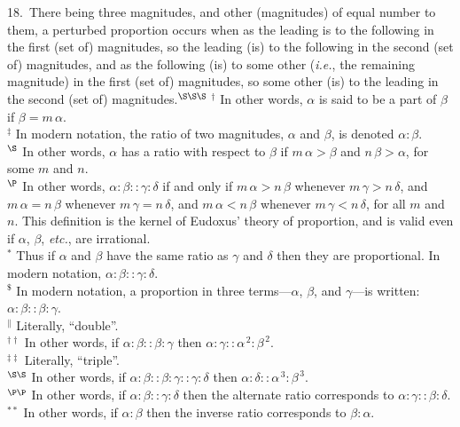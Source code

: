 18.~There being three magnitudes,
  and  other (magnitudes)
 of equal  number to them,  a  perturbed proportion occurs  when  as 
 the  leading is to the following
 in the first (set of) magnitudes, so the  leading (is) to the following  in the second (set of) magnitudes, and as   the following (is) to
 some other ({\em i.e.}, the remaining magnitude) in the first (set of) magnitudes, so some other (is)  to the leading  in the second (set of) magnitudes.$^{\S\S\S}$
{\footnotesize \noindent$^\dag$ In other words, $\alpha$ is said to be a part of $\beta$ if $\beta = m\,\alpha$.\\[0.5ex]
$^\ddag$ In modern notation, the ratio of two 
magnitudes, $\alpha$ and $\beta$, is denoted $\alpha:\beta$.\\[0.5ex]
$^\S$ In other words, $\alpha$ has a ratio with respect to $\beta$ if $m\,\alpha >\beta$
and $n\,\beta>\alpha$, for some $m$ and $n$.\\[0.5ex]
$^\P$ In other words, $\alpha:\beta::\gamma:\delta$ if and only if $m\,\alpha>n\,\beta$ whenever $m\,\gamma>n\,\delta$, and $m\,\alpha=n\,\beta$
whenever $m\,\gamma=n\,\delta$, and $m\,\alpha< n\,\beta$ whenever $m\,\gamma<
n\,\delta$, for all $m$ and $n$. This definition  is the kernel of Eudoxus' theory of proportion, and is valid even if $\alpha$,  $\beta$, {\em etc.}, are irrational.\\[0.5ex]
$^\ast$ Thus if $\alpha$ and $\beta$ have the same ratio
as $\gamma$ and $\delta$ then they are proportional. In modern notation,
$\alpha:\beta::\gamma:\delta$.\\[0.5ex]
$^{\$}$ In modern notation, a proportion in three terms---$\alpha$, $\beta$, and $\gamma$---is written: $\alpha:\beta::\beta:\gamma$.\\
$^{\|}$ Literally, ``double''.\\[0.5ex]
$^{\dag\dag}$ In other words, if $\alpha:\beta::\beta:\gamma$ then $\alpha:\gamma::\alpha^{\,2}:\beta^{\,2}$.\\[0.5ex]
$^{\ddag\ddag}$ Literally, ``triple''.\\[0.5ex]
$^{\S\S}$ In other words, if $\alpha:\beta::\beta:\gamma::\gamma:\delta$ then $\alpha:\delta::\alpha^{\,3}:\beta^{\,3}$.\\[0.5ex]
$^{\P\P}$ In other words, if $\alpha:\beta::\gamma:\delta$ then the alternate ratio
corresponds to  $\alpha:\gamma::\beta:\delta$.\\[0.5ex]
$^{\ast\ast}$ In other words, if  $\alpha:\beta$ then the inverse ratio
corresponds to $\beta:\alpha$.\\[0.5ex]
}
